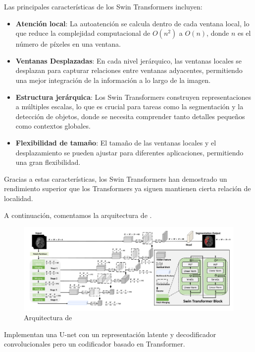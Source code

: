 	Las principales características de los Swin Transformers incluyen:
	
	\begin{itemize}
		\item \textbf{Atención local}: La autoatención se calcula dentro de cada ventana local, lo que reduce la complejidad computacional de $O(n^2)$ a $O(n)$, donde $n$ es el número de píxeles en una ventana.
		\item \textbf{Ventanas Desplazadas}: En cada nivel jerárquico, las ventanas locales se desplazan para capturar relaciones entre ventanas adyacentes, permitiendo una mejor integración de la información a lo largo de la imagen.
		\item \textbf{Estructura jerárquica}: Los Swin Transformers construyen representaciones a múltiples escalas, lo que es crucial para tareas como la segmentación y la detección de objetos, donde se necesita comprender tanto detalles pequeños como contextos globales.
		\item \textbf{Flexibilidad de tamaño}: El tamaño de las ventanas locales y el desplazamiento se pueden ajustar para diferentes aplicaciones, permitiendo una gran flexibilidad.
	\end{itemize}
	
	Gracias a estas características, los Swin Transformers han demostrado un rendimiento superior que los Transformers ya siguen mantienen cierta relación de localidad.
	
	A continuación, comentamos la arquitectura de \cite{hatamizadeh2021swin}.
	
	\begin{figure}[H]
		\centering
		\includegraphics[width=1.0\linewidth]{imagenes/swinunet.png}
		\caption{Arquitectura de \cite{hatamizadeh2021swin}}
	\end{figure}
	
	Implementan una U-net con un representación latente y decodificador convolucionales pero un codificador basado en Transformer.
	
